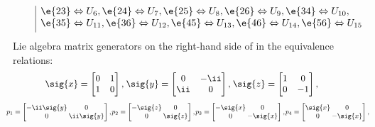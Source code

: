 \begin{unit}
\[\begin{array}{cc|l}
& &\e{23}\Leftrightarrow U_6,\e{24}\Leftrightarrow U_7,\e{25}\Leftrightarrow U_8,\e{26}\Leftrightarrow U_9,\e{34}\Leftrightarrow U_{10},\\
& &\e{35}\Leftrightarrow U_{11},\e{36}\Leftrightarrow U_{12},\e{45}\Leftrightarrow U_{13},\e{46}\Leftrightarrow U_{14},\e{56}\Leftrightarrow U_{15}\\[3pt]
\end{array}
\]
Lie algebra matrix generators  on the right-hand side of in the
equivalence relations:
\[\small
\!\begin{aligned}
\mkern-18mu \sig{x}&=\begin{bmatrix}0&1\\1&0\end{bmatrix},\,&
\mkern-18mu \sig{y}&=\begin{bmatrix}0&-\ii\\\ii&0\end{bmatrix},\,&
\mkern-18mu \sig{z}&=\begin{bmatrix}1&0\\0&-1\end{bmatrix},
\end{aligned}
\]
%
\[\small
\setlength{\arraycolsep}{1pt}
\!\begin{aligned}
\mkern-18mu p_1&=\begin{bmatrix}-\ii\sig{y}&0\\0&\ii \sig{y}\end{bmatrix},&
\mkern-18mu p_2&=\begin{bmatrix}-\sig{z}&0\\0&\sig{z}\end{bmatrix},&
\mkern-18mu p_3&=\begin{bmatrix}-\sig{x}&0\\0&-\sig{x}\end{bmatrix},&
\mkern-18mu p_4&=\begin{bmatrix}\sig{x}&0\\0&-\sig{x}\end{bmatrix},\\

\end{aligned}\]
\end{unit}
